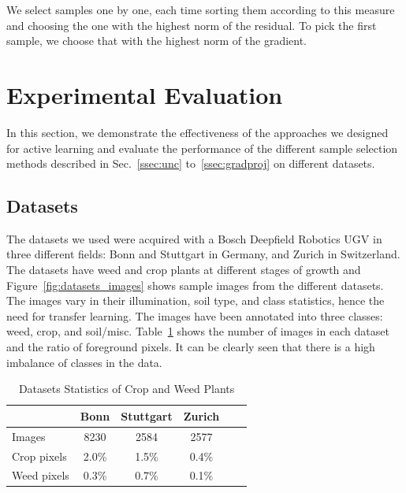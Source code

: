 \documentclass[letterpaper, 10 pt, conference]{ieeeconf}  %
\def\secref#1{Sec.~\ref{#1}}
\begin{document}
We select samples one by one, each time sorting them according to this measure and choosing the one with the highest norm of the residual. To pick the first sample, we choose that with the highest norm of the gradient.



\section{Experimental Evaluation}
\label{sec:exp}

In this section, we demonstrate the effectiveness of the approaches we designed for active learning and evaluate the performance of the different sample selection methods described in \secref{ssec:unc} to~\ref{ssec:gradproj} on different datasets.

\subsection{Datasets}

The datasets we used were acquired with a Bosch Deepfield Robotics UGV in three different fields: Bonn and Stuttgart in Germany, and Zurich in Switzerland. The datasets have weed and crop plants at different stages of growth and Figure~\ref{fig:datasets_images} shows sample images from the different datasets. The images vary in their illumination, soil type, and class statistics, hence the need for transfer learning. The images have been annotated into three classes:  weed, crop, and soil/misc.  Table~\ref{tab:datasets_stats} shows the number of images in each dataset and the ratio of foreground pixels. It can be clearly seen that there is a high imbalance of classes in the data.



    \begin{table}
       \vspace{1em}
        \centering
        \caption{Datasets Statistics of Crop and Weed Plants}
        \begin{tabular}{@{}lccccc@{}} 
            \toprule
              & Bonn & Stuttgart & Zurich \\ 
            \midrule 
    		  Images  & 8230 & 2584 & 2577 \\ \addlinespace
    		  Crop pixels & 2.0\% & 1.5\% & 0.4\%  \\ \addlinespace
    		  Weed pixels & 0.3\% & 0.7\% & 0.1\%  \\    
            \bottomrule
        \end{tabular}
        \label{tab:datasets_stats}
    \end{table}
     
\end{document}

